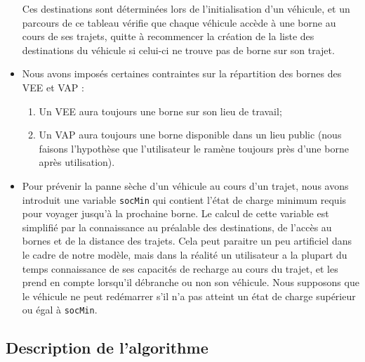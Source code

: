 \begin{itemize}
\begin{description}
				\end{description}
			Ces destinations sont déterminées lors de l'initialisation d'un véhicule, et un parcours de ce tableau vérifie que chaque véhicule accède à une borne au cours de ses trajets, quitte à recommencer la création de la liste des destinations du véhicule si celui-ci ne trouve pas de borne sur son trajet.
			\item Nous avons imposés certaines contraintes sur la répartition des bornes des VEE et VAP :
				\begin{enumerate}
					\item Un VEE aura toujours une borne sur son lieu de travail;
					\item Un VAP aura toujours une borne disponible dans un lieu public (nous faisons l'hypothèse que l'utilisateur le ramène toujours près d'une borne après utilisation).
				\end{enumerate}
			\item Pour prévenir la \og{}panne sèche\fg{} d'un véhicule au cours d'un trajet, nous avons introduit une variable \lstinline|socMin| qui contient l'état de charge minimum requis pour voyager jusqu'à la prochaine borne. Le calcul de cette variable est simplifié par la connaissance au préalable des destinations, de l'accès au bornes et de la distance des trajets. Cela peut paraitre un peu artificiel dans le cadre de notre modèle, mais dans la réalité un utilisateur a la plupart du temps connaissance de ses capacités de recharge au cours du trajet, et les prend en compte lorsqu'il débranche ou non son véhicule. Nous supposons que le véhicule ne peut redémarrer s'il n'a pas atteint un état de charge supérieur ou égal à \lstinline|socMin|. 
		\end{itemize}

	\subsection{Description de l'algorithme}
		
